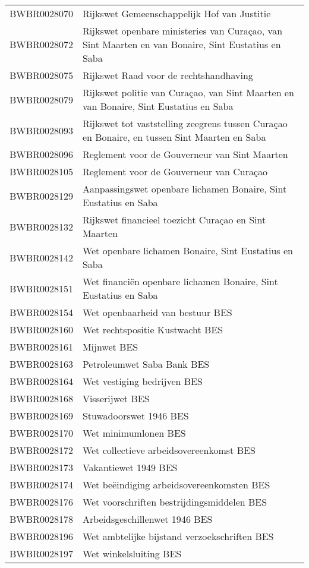 \begin{longtable}{lp{}}
BWBR0028070 & Rijkswet Gemeenschappelijk Hof van Justitie \\
BWBR0028072 & Rijkswet openbare ministeries van Curaçao, van Sint Maarten en van Bonaire, Sint Eustatius en Saba \\
BWBR0028075 & Rijkswet Raad voor de rechtshandhaving \\
BWBR0028079 & Rijkswet politie van Curaçao, van Sint Maarten en van Bonaire, Sint Eustatius en Saba \\
BWBR0028093 & Rijkswet tot vaststelling zeegrens tussen Curaçao en Bonaire, en tussen Sint Maarten en Saba \\
BWBR0028096 & Reglement voor de Gouverneur van Sint Maarten \\
BWBR0028105 & Reglement voor de Gouverneur van Curaçao \\
BWBR0028129 & Aanpassingswet openbare lichamen Bonaire, Sint Eustatius en Saba \\
BWBR0028132 & Rijkswet financieel toezicht Curaçao en Sint Maarten  \\
BWBR0028142 & Wet openbare lichamen Bonaire, Sint Eustatius en Saba \\
BWBR0028151 & Wet financiën openbare lichamen Bonaire, Sint Eustatius en Saba \\
BWBR0028154 & Wet openbaarheid van bestuur BES  \\
BWBR0028160 & Wet rechtspositie Kustwacht BES \\
BWBR0028161 & Mijnwet BES \\
BWBR0028163 & Petroleumwet Saba Bank BES \\
BWBR0028164 & Wet vestiging bedrijven BES \\
BWBR0028168 & Visserijwet BES \\
BWBR0028169 & Stuwadoorswet 1946 BES \\
BWBR0028170 & Wet minimumlonen BES \\
BWBR0028172 & Wet collectieve arbeidsovereenkomst BES \\
BWBR0028173 & Vakantiewet 1949 BES \\
BWBR0028174 & Wet beëindiging arbeidsovereenkomsten BES \\
BWBR0028176 & Wet voorschriften bestrijdingsmiddelen BES \\
BWBR0028178 & Arbeidsgeschillenwet 1946 BES \\
BWBR0028196 & Wet ambtelijke bijstand verzoekschriften BES \\
BWBR0028197 & Wet winkelsluiting BES \\

\end{longtable}
